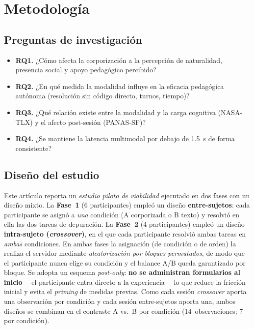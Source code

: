 \documentclass[conference]{IEEEtran}
\begin{document}
\section{Metodolog\'ia}
\label{sec:method}

\subsection{Preguntas de investigaci\'on}
\begin{itemize}
  \item \textbf{RQ1.} ¿C\'omo afecta la corporizaci\'on a la percepci\'on de naturalidad,
        presencia social y apoyo pedag\'ogico percibido?
  \item \textbf{RQ2.} ¿En qu\'e medida la modalidad influye en la eficacia pedag\'ogica
        aut\'onoma (resoluci\'on sin c\'odigo directo, turnos, tiempo)?
  \item \textbf{RQ3.} ¿Qu\'e relaci\'on existe entre la modalidad y la carga cognitiva (NASA-TLX)
        y el afecto post-sesi\'on (PANAS-SF)?
  \item \textbf{RQ4.} ¿Se mantiene la latencia multimodal por debajo de 1.5~s de forma
        consistente?
\end{itemize}

\subsection{Dise\~no del estudio}
Este art\'iculo reporta un \emph{estudio piloto de viabilidad} ejecutado en dos fases con un
dise\~no mixto. La \textbf{Fase~1} (6 participantes) emple\'o un dise\~no \textbf{entre-sujetos}:
cada participante se asign\'o a \emph{una} condici\'on (A corporizada o B texto) y resolvi\'o en
ella las dos tareas de depuraci\'on. La \textbf{Fase~2} (4 participantes) emple\'o un dise\~no
\textbf{intra-sujeto (\emph{crossover})}, en el que cada participante resolvi\'o ambas tareas en
\emph{ambas} condiciones. En ambas fases la asignaci\'on (de condici\'on o de orden) la realiza el
servidor mediante \emph{aleatorizaci\'on por bloques permutados}, de modo que el participante nunca
elige su condici\'on y el balance A/B queda garantizado por bloque. Se adopta un esquema
\emph{post-only}: \textbf{no se administran formularios al inicio} ---el participante entra directo
a la experiencia--- lo que reduce la fricci\'on inicial y evita el \emph{priming} de medidas
previas. Como cada sesi\'on \emph{crossover} aporta una observaci\'on por condici\'on y cada sesi\'on
entre-sujetos aporta una, ambos dise\~nos se combinan en el contraste A vs.\ B por condici\'on
(14~observaciones; 7 por condici\'on).
\end{document}
